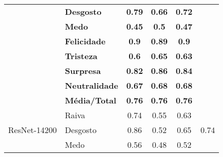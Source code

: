 \begin{table}[]
\begin{tabular}{llcccc}
                                         & \textbf{Desgosto}     & \textbf{0.79}                         & \textbf{0.66}                          & \textbf{0.72}                         &                                       \\
                                         & \textbf{Medo}         & \textbf{0.45}                         & \textbf{0.5}                           & \textbf{0.47}                         &                                       \\
                                         & \textbf{Felicidade}   & \textbf{0.9}                          & \textbf{0.89}                          & \textbf{0.9}                          &                                       \\
                                         & \textbf{Tristeza}     & \textbf{0.6}                          & \textbf{0.65}                          & \textbf{0.63}                         &                                       \\
                                         & \textbf{Surpresa}     & \textbf{0.82}                         & \textbf{0.86}                          & \textbf{0.84}                         &                                       \\
                                         & \textbf{Neutralidade} & \textbf{0.67}                         & \textbf{0.68}                          & \textbf{0.68}                         &                                       \\
                                         & \textbf{Média/Total}  & \textbf{0.76}                         & \textbf{0.76}                          & \textbf{0.76}                         &                                       \\ \hline
\multirow{8}{*}{ResNet-14200}          & Raiva                 & 0.74                                  & 0.55                                   & 0.63                                  & \multirow{8}{*}{0.74}                 \\
                                         & Desgosto              & 0.86                                  & 0.52                                   & 0.65                                  &                                       \\
                                         & Medo                  & 0.56                                  & 0.48                                   & 0.52                                  &                                       \\

\end{tabular}
\end{table}
